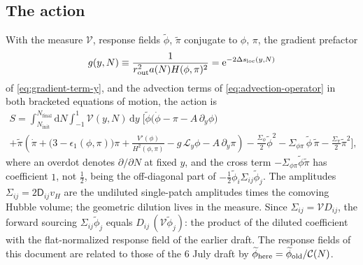 \documentclass[a4paper,11pt]{article}
\renewcommand{\d}{\mathrm{d}}
\newcommand{\e}[1]{\mathrm{e}^{{#1}}}
\newcommand{\Ny}{N}                          %
\newcommand{\Ninit}{N_{\mathrm{init}}}       %
\newcommand{\Nfinal}{N_{\mathrm{final}}}     %
\newcommand{\epsSR}{\epsilon_1}              %
\newcommand{\Hub}{H}                         %
\newcommand{\sfactor}{a}                     %
\newcommand{\atloc}{(\field,\mom)}           %
\newcommand{\field}{\phi}                    %
\newcommand{\mom}{\pi}                       %
\newcommand{\Vpot}{V}                        %
\newcommand{\rfield}{\widetilde\field}       %
\newcommand{\rmom}{\widetilde\mom}           %
\newcommand{\rad}{r}                         %
\newcommand{\yco}{y}                         %
\newcommand{\rout}{\rad_{\mathrm{out}}}      %
\newcommand{\aHloc}{\sfactor(\Ny)\Hub\atloc} %
\newcommand{\Deltas}{\Delta s}                %
\newcommand{\advcoef}{A}                     %
\newcommand{\Lop}{\mathcal{L}_\yco}          %
\newcommand{\Dnoise}[1]{D_{#1}}              %
\newcommand{\Dcm}[1]{\mathsf{D}_{#1}}        %
\newcommand{\volel}{\mathcal{V}}             %
\newcommand{\Cpref}{\mathcal{C}}             %
\newcommand{\Sigvol}[1]{\varSigma_{#1}}      %
\newcommand{\vH}{v_H}                        %
\newcommand{\gpref}{g}                        %
\begin{document}
\subsection{The action}

With the measure $\volel$, response fields $\rfield$, $\rmom$ conjugate to
$\field$, $\mom$, the gradient prefactor
\begin{equation}
    \gpref(\yco,\Ny) \equiv \frac{1}{\rout^2\aHloc^2} = \e{-2\Deltas_{\rm loc}(\yco,\Ny)}
    \label{eq:gpref-definition}
\end{equation}
of \eqref{eq:gradient-term-y}, and the advection terms of
\eqref{eq:advection-operator} in both bracketed equations of motion, the
action is
\begin{multline}
    S
    =
    \int_{\Ninit}^{\Nfinal}\! \d\Ny \int_{-1}^1\! \volel(\yco,\Ny)\,\d\yco \; \Bigg[
    \rfield \Big( \dot\field - \mom - \advcoef\,\partial_\yco\field \Big)
    \\
    +
    \rmom \left( \dot\mom + \big(3-\epsSR\atloc\big)\mom + \frac{\Vpot'(\field)}{\Hub^2\atloc}
    - \gpref\,\Lop\field - \advcoef\,\partial_\yco\mom \right)
    -
    \frac{\Sigvol{\field}}{2}\rfield^2
    -
    \Sigvol{\field\mom}\,\rfield\,\rmom
    -
    \frac{\Sigvol{\mom}}{2}\rmom^2
    \Bigg] ,
    \label{eq:msr-action}
\end{multline}
where an overdot denotes $\partial/\partial\Ny$ at fixed $\yco$, and the
cross term $-\Sigvol{\field\mom}\rfield\rmom$ has coefficient $1$, not
$\tfrac12$, being the off-diagonal part of $-\tfrac12\rfield_i\Sigvol{ij}\rfield_j$.
The amplitudes $\Sigvol{ij}=2\Dcm{ij}\vH$ are the undiluted single-patch
amplitudes times the comoving Hubble volume; the geometric dilution lives
in the measure. Since $\Sigvol{ij}=\volel\Dnoise{ij}$, the forward
sourcing $\Sigvol{ij}\rfield_j$ equals $\Dnoise{ij}\,(\volel\rfield_j)$: the
product of the diluted coefficient with the flat-normalized response field
of the earlier draft. The response fields of this document are related to
those of the 6 July draft by $\rfield_{\rm here}=\rfield_{\rm old}/\Cpref(\Ny)$.
\end{document}
